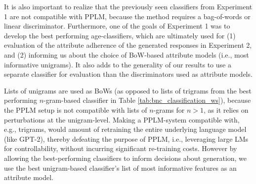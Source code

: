 It is also important to realize that the previously seen classifiers from Experiment 1 are not compatible with PPLM, because the method requires a bag-of-words or linear discriminator. Furthermore, one of the goals of Experiment 1 was to develop the best performing age-classifiers, which are ultimately used for (1) evaluation of the attribute adherence of the generated responses in Experiment 2, and (2) informing us about the choice of BoW-based attribute models (i.e., most informative unigrams). It also adds to the generality of our results to use a separate classifier for evaluation than the discriminators used as attribute models.

Lists of unigrams are used as BoWs (as opposed to lists of trigrams from the best performing $n$-gram-based classifier in Table \ref{tab:bnc_classification_ws}), because the PPLM setup is not compatible with lists of $n$-grams for $n > 1$, as it relies on perturbations at the unigram-level. Making a PPLM-system compatible with, e.g., trigrams, would amount of retraining the entire underlying language model (like GPT-2), thereby defeating the purpose of PPLM, i.e., leveraging large LMs for controllability, without incurring significant re-training costs. However by allowing the best-performing classifiers to inform decisions about generation, we use the best unigram-based classifier's list of most informative features as an attribute model.


